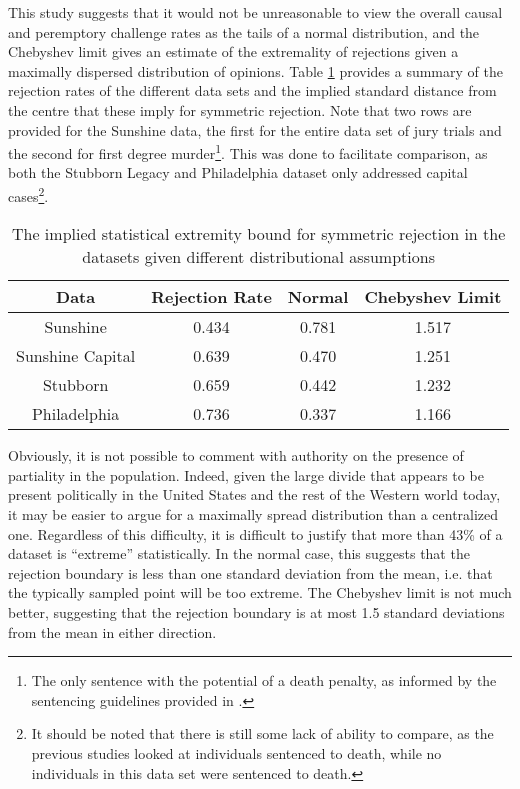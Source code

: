 This study suggests that it would not be unreasonable to view the overall causal and peremptory challenge rates as the tails of a
normal distribution, and the Chebyshev limit gives an estimate of the extremality of rejections given a maximally dispersed
distribution of opinions. Table \ref{tab:rejbounds} provides a summary of the rejection rates of the different data sets and the
implied standard distance from the centre that these imply for symmetric rejection. Note that two rows are provided for the
Sunshine data, the first for the entire data set of jury trials and the second for first degree murder\footnote{The only sentence
  with the potential of a death penalty, as informed by the sentencing guidelines provided in \cite{offenseclass}.}. This was done to
facilitate comparison, as both the Stubborn Legacy and Philadelphia dataset only addressed capital cases\footnote{It should be
  noted that there is still some lack of ability to compare, as the previous studies looked at individuals sentenced to death,
  while no individuals in this data set were sentenced to death.}.

\begin{table}[h!]
  \centering
  \caption[Implied Rejection Boundaries]{\footnotesize The implied statistical extremity bound for symmetric rejection in the datasets given
    different distributional assumptions} \label{tab:rejbounds}
  \begin{tabular}{|c|c|c|c|} \hline
    Data & Rejection Rate & Normal & Chebyshev Limit \\ \hline
    Sunshine & 0.434 & 0.781 & 1.517 \\
    Sunshine Capital & 0.639 & 0.470 & 1.251 \\
    Stubborn & 0.659 & 0.442 & 1.232 \\
    Philadelphia & 0.736 & 0.337 & 1.166 \\
    \hline
  \end{tabular}
\end{table}

Obviously, it is not possible to comment with authority on the presence of partiality in the population. Indeed, given the large
divide that appears to be present politically in the United States and the rest of the Western world today, it may be easier to
argue for a maximally spread distribution than a centralized one. Regardless of this difficulty, it is difficult to justify that
more than 43\% of a dataset is ``extreme'' statistically. In the normal case, this suggests that the rejection boundary is less
than one standard deviation from the mean, i.e. that the typically sampled point will be too extreme. The Chebyshev limit is not
much better, suggesting that the rejection boundary is at most 1.5 standard deviations from the mean in either direction.

